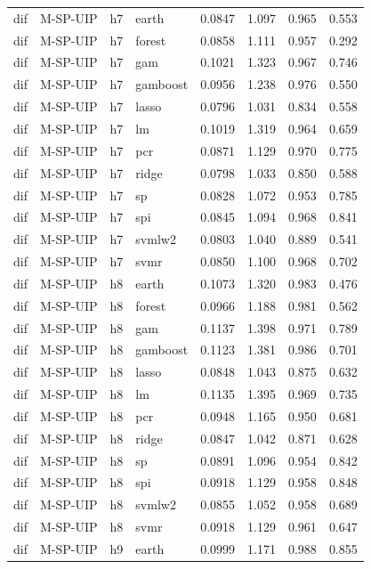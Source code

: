 \begin{ThreePartTable}
\begin{longtable}[t]{llclcccc}
\addlinespace
dif & M-SP-UIP & h7 & earth & 0.0847 & 1.097 & 0.965 & 0.553\\
dif & M-SP-UIP & h7 & forest & 0.0858 & 1.111 & 0.957 & 0.292\\
dif & M-SP-UIP & h7 & gam & 0.1021 & 1.323 & 0.967 & 0.746\\
dif & M-SP-UIP & h7 & gamboost & 0.0956 & 1.238 & 0.976 & 0.550\\
dif & M-SP-UIP & h7 & lasso & 0.0796 & 1.031 & 0.834 & 0.558\\
dif & M-SP-UIP & h7 & lm & 0.1019 & 1.319 & 0.964 & 0.659\\
dif & M-SP-UIP & h7 & pcr & 0.0871 & 1.129 & 0.970 & 0.775\\
dif & M-SP-UIP & h7 & ridge & 0.0798 & 1.033 & 0.850 & 0.588\\
dif & M-SP-UIP & h7 & sp & 0.0828 & 1.072 & 0.953 & 0.785\\
dif & M-SP-UIP & h7 & spi & 0.0845 & 1.094 & 0.968 & 0.841\\
dif & M-SP-UIP & h7 & svmlw2 & 0.0803 & 1.040 & 0.889 & 0.541\\
dif & M-SP-UIP & h7 & svmr & 0.0850 & 1.100 & 0.968 & 0.702\\
\addlinespace
dif & M-SP-UIP & h8 & earth & 0.1073 & 1.320 & 0.983 & 0.476\\
dif & M-SP-UIP & h8 & forest & 0.0966 & 1.188 & 0.981 & 0.562\\
dif & M-SP-UIP & h8 & gam & 0.1137 & 1.398 & 0.971 & 0.789\\
dif & M-SP-UIP & h8 & gamboost & 0.1123 & 1.381 & 0.986 & 0.701\\
dif & M-SP-UIP & h8 & lasso & 0.0848 & 1.043 & 0.875 & 0.632\\
dif & M-SP-UIP & h8 & lm & 0.1135 & 1.395 & 0.969 & 0.735\\
dif & M-SP-UIP & h8 & pcr & 0.0948 & 1.165 & 0.950 & 0.681\\
dif & M-SP-UIP & h8 & ridge & 0.0847 & 1.042 & 0.871 & 0.628\\
dif & M-SP-UIP & h8 & sp & 0.0891 & 1.096 & 0.954 & 0.842\\
dif & M-SP-UIP & h8 & spi & 0.0918 & 1.129 & 0.958 & 0.848\\
dif & M-SP-UIP & h8 & svmlw2 & 0.0855 & 1.052 & 0.958 & 0.689\\
dif & M-SP-UIP & h8 & svmr & 0.0918 & 1.129 & 0.961 & 0.647\\
\addlinespace
dif & M-SP-UIP & h9 & earth & 0.0999 & 1.171 & 0.988 & 0.855\\

\end{longtable}
\end{ThreePartTable}
